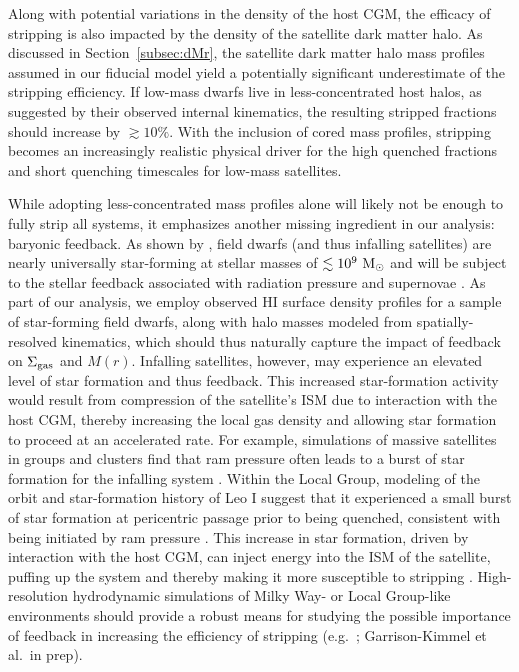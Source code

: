 Along with potential variations in the density of the host CGM, the
efficacy of stripping is also impacted by the density of the satellite
dark matter halo.
%
As discussed in Section~\ref{subsec:dMr}, the satellite dark matter
halo mass profiles assumed in our fiducial model yield a potentially
significant underestimate of the stripping efficiency.
%
If low-mass dwarfs live in less-concentrated host halos, as suggested
by their observed internal kinematics, the resulting stripped
fractions should increase by $\gtrsim 10\%$. 
%
With the inclusion of cored mass profiles, stripping becomes an
increasingly realistic physical driver for the high quenched fractions
and short quenching timescales for low-mass satellites. 


While adopting less-concentrated mass profiles alone will likely not
be enough to fully strip all systems, it emphasizes another missing
ingredient in our analysis: baryonic feedback.
%
As shown by \citet{geha12}, field dwarfs (and thus infalling
satellites) are nearly universally star-forming at stellar masses of
$\lesssim10^{9}~{\rm M}_{\odot}$ and will be subject to the stellar feedback
associated with radiation pressure and supernovae \citep[e.g][]{mqt05,
  hopkins14}.
%
As part of our analysis, we employ observed H{\scriptsize I} surface
density profiles for a sample of star-forming field dwarfs, along with
halo masses modeled from spatially-resolved kinematics, which should
thus naturally capture the impact of feedback on $\Sigma_{\rm gas}$
and $M(r)$.
%
Infalling satellites, however, may experience an elevated level of
star formation and thus feedback. 
%
This increased star-formation activity would result from compression
of the satellite's ISM due to interaction with the host CGM, thereby
increasing the local gas density and allowing star formation to
proceed at an accelerated rate.
%
For example, simulations of massive satellites in groups and clusters
find that ram pressure often leads to a burst of star formation for
the infalling system \citep{fujita99, bekki03, bekki14}.
%
Within the Local Group, modeling of the orbit and star-formation
history of Leo I suggest that it experienced a small burst of star
formation at pericentric passage prior to being quenched, consistent
with being initiated by ram pressure \citep{sohn13, bk13,
  weisz14a}.
%
%
This increase in star formation, driven by interaction with the host
CGM, can inject energy into the ISM of the satellite, puffing up the
system and thereby making it more susceptible to stripping
\citep[][but see also \citealt{emerick16}]{stinson07, el15}.
High-resolution hydrodynamic simulations of Milky Way- or Local
Group-like environments should provide a robust means for studying the
possible importance of feedback in increasing the efficiency of
stripping (e.g.~\citealt{zolotov12, mistani16, wetzel16};
Garrison-Kimmel et al.~in prep).



